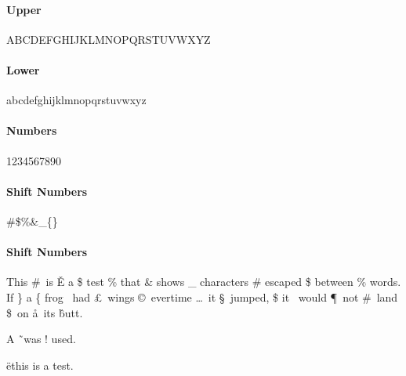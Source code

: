 \documentclass[12pt]{article}%
\begin{document}
%

\paragraph{Upper}
ABCDEFGHIJKLMNOPQRSTUVWXYZ

\paragraph{Lower}
abcdefghijklmnopqrstuvwxyz

\paragraph{Numbers}
1234567890

\paragraph{Shift Numbers}
\#\$\%\&\_\{\}

\paragraph{Shift Numbers}
This \#\ is \v{E} a \$ test \% that \& shows \_ characters \# escaped \$ between \%
words.  If \} a \{ frog \ddag\ had \pounds\ wings \copyright\ evertime \dots\ 
it \S\ jumped, \$ it \dag\ would \P\ not \#\ land \$\ on \aa\ its \^ butt.  

A \~\ was ! used.

\"{e}this is a test.
\end{document}
